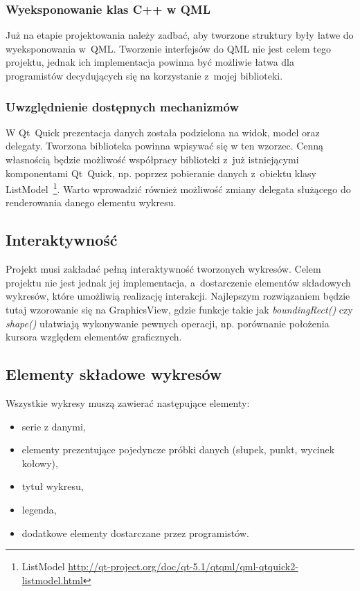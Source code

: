 \subsubsection{Wyeksponowanie klas C++ w QML}
Już na etapie projektowania należy zadbać, aby tworzone struktury były łatwe do wyeksponowania w~QML. 
Tworzenie interfejsów do QML nie jest celem tego projektu, jednak ich implementacja powinna być możliwie łatwa dla programistów decydujących się na korzystanie z~mojej biblioteki.

\subsubsection{Uwzględnienie dostępnych mechanizmów}
W Qt~Quick prezentacja danych została podzielona na widok, model oraz delegaty. Tworzona biblioteka powinna wpisywać się w ten wzorzec. Cenną własnością będzie możliwość współpracy biblioteki z~już istniejącymi komponentami Qt~Quick, np. poprzez pobieranie danych z~obiektu klasy ListModel~\footnote{ListModel \url{http://qt-project.org/doc/qt-5.1/qtqml/qml-qtquick2-listmodel.html}}. Warto wprowadzić również możliwość zmiany delegata służącego do renderowania danego elementu wykresu.

\subsection{Interaktywność}
Projekt musi zakładać pełną interaktywność tworzonych wykresów. Celem projektu nie jest jednak jej implementacja, a~dostarczenie elementów składowych wykresów, które umożliwią realizację interakcji. Najlepszym rozwiązaniem będzie tutaj wzorowanie się na GraphicsView, gdzie funkcje takie jak \textit{boundingRect()} czy \textit{shape()} ułatwiają wykonywanie pewnych operacji, np. porównanie położenia kursora względem elementów graficznych.


\subsection{Elementy składowe wykresów}
Wszystkie wykresy muszą zawierać następujące elementy:
\begin{itemize}
\item{serie z danymi,}
\item{elementy prezentujące pojedyncze próbki danych (słupek, punkt, wycinek kołowy),}
\item{tytuł wykresu,}
\item{legenda,}
\item{dodatkowe elementy dostarczane przez programistów.}
\end{itemize}

